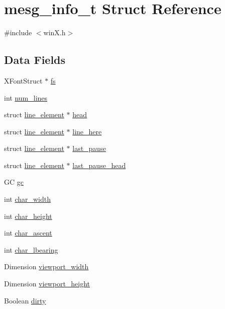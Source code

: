 \hypertarget{structmesg__info__t}{\section{mesg\+\_\+info\+\_\+t Struct Reference}
\label{structmesg__info__t}
}


{\ttfamily \#include $<$win\+X.\+h$>$}

\subsection*{Data Fields}
\begin{DoxyCompactItemize}
\item 
X\+Font\+Struct $\ast$ \hyperlink{structmesg__info__t_a3ac4711a90ce72d56e435d5d44167932}{fs}
\item 
int \hyperlink{structmesg__info__t_aba23aab1261a0730bd4fef133f902d81}{num\+\_\+lines}
\item 
struct \hyperlink{structline__element}{line\+\_\+element} $\ast$ \hyperlink{structmesg__info__t_a9ec2627ed09c84d0871571ab1b004961}{head}
\item 
struct \hyperlink{structline__element}{line\+\_\+element} $\ast$ \hyperlink{structmesg__info__t_afd9b6c059ba606c7181a04036e0a1d56}{line\+\_\+here}
\item 
struct \hyperlink{structline__element}{line\+\_\+element} $\ast$ \hyperlink{structmesg__info__t_a45ba0dcdbeb9c6492d19f4712b003254}{last\+\_\+pause}
\item 
struct \hyperlink{structline__element}{line\+\_\+element} $\ast$ \hyperlink{structmesg__info__t_af8c5f5bc77a707da17810c00e7dbb0a4}{last\+\_\+pause\+\_\+head}
\item 
G\+C \hyperlink{structmesg__info__t_ace94c43075742d8ba4d9109669ba078c}{gc}
\item 
int \hyperlink{structmesg__info__t_a9d448d94905365fda9859981ae2d07a1}{char\+\_\+width}
\item 
int \hyperlink{structmesg__info__t_af7ceb1e904683a4ef31352aa7697390e}{char\+\_\+height}
\item 
int \hyperlink{structmesg__info__t_a737e633cc653b3e01eaf308564d362c3}{char\+\_\+ascent}
\item 
int \hyperlink{structmesg__info__t_a8533deec9572890a70ba02b6cae67951}{char\+\_\+lbearing}
\item 
Dimension \hyperlink{structmesg__info__t_ae15ee1ff248f494358a3acafb446c19d}{viewport\+\_\+width}
\item 
Dimension \hyperlink{structmesg__info__t_a305a331f90a384bcdd196ee554eb4402}{viewport\+\_\+height}
\item 
Boolean \hyperlink{structmesg__info__t_a08f16d5343387918e19cb9812303a4c7}{dirty}
\end{DoxyCompactItemize}


